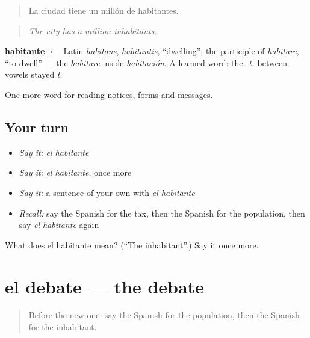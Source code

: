 \begin{quote}
La ciudad tiene un millón de habitantes.
\end{quote}

\begin{quote}
\emph{The city has a million inhabitants.}
\end{quote}

\begin{cousinweb}
\textbf{habitante} $\leftarrow$ Latin \emph{habitans}, \emph{habitantis}, \textquotedblleft{}dwelling\textquotedblright{}, the participle of \emph{habitare}, \textquotedblleft{}to dwell\textquotedblright{} — the \emph{habitare} inside \emph{habitación}. A learned word: the \emph{-t-} between vowels stayed \emph{t}.
\end{cousinweb}

\begin{grammarlens}[title={What you've built}]
One more word for reading notices, forms and messages.
\end{grammarlens}

\subsection*{Your turn}
\begin{itemize}
\raggedright
  \item \emph{Say it:} \emph{el habitante}
  \item \emph{Say it:} \emph{el habitante}, once more
  \item \emph{Say it:} a sentence of your own with \emph{el habitante}
  \item \emph{Recall:} say the Spanish for the tax, then the Spanish for the population, then say \emph{el habitante} again
\end{itemize}

\begin{tcolorbox}[breakable,colback=teal!4,colframe=teal!35!black,title={Before you move on}]
What does el habitante mean? (\textquotedblleft{}The inhabitant\textquotedblright{}.) Say it once more.
\end{tcolorbox}
\section[el debate]{el debate — the debate}

\label{lesson:ES-C507-debate}



\begin{quote}
Before the new one: say the Spanish for the population, then the Spanish for the inhabitant.
\end{quote}

